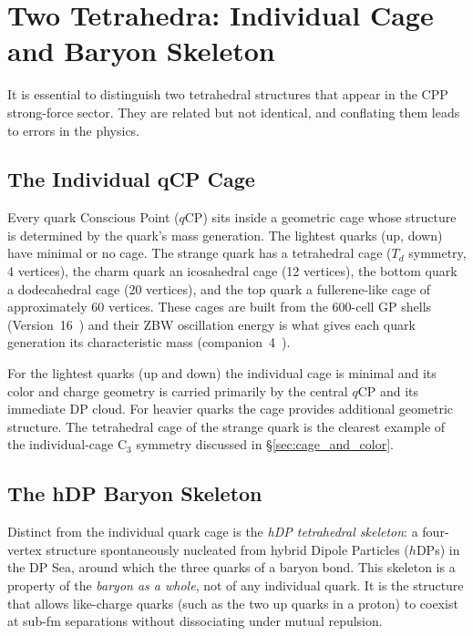\documentclass[12pt]{article}
\newcommand{\qCP}{q\mathrm{CP}}
\newcommand{\hDP}{h\mathrm{DP}}
\newcommand{\Td}{T_d}
\begin{document}
\section{Two Tetrahedra: Individual Cage and Baryon Skeleton}
\label{sec:two_tets}

It is essential to distinguish two tetrahedral structures that appear
in the CPP strong-force sector.  They are related but not identical,
and conflating them leads to errors in the physics.

\subsection{The Individual qCP Cage}

Every quark Conscious Point ($\qCP$) sits inside a geometric cage
whose structure is determined by the quark's mass generation.
The lightest quarks (up, down) have minimal or no cage.  The strange
quark has a tetrahedral cage ($\Td$ symmetry, 4 vertices), the charm
quark an icosahedral cage (12 vertices), the bottom quark a
dodecahedral cage (20 vertices), and the top quark a fullerene-like
cage of approximately 60 vertices.  These cages are built from the
600-cell GP shells (Version~16~\cite{v16}) and their ZBW oscillation
energy is what gives each quark generation its characteristic mass
(companion~4~\cite{c4}).

For the lightest quarks (up and down) the individual cage is minimal
and its color and charge geometry is carried primarily by the central
$\qCP$ and its immediate DP cloud.  For heavier quarks the cage
provides additional geometric structure.  The tetrahedral cage of
the strange quark is the clearest example of the individual-cage
C$_3$ symmetry discussed in §\ref{sec:cage_and_color}.

\subsection{The hDP Baryon Skeleton}

Distinct from the individual quark cage is the \emph{hDP tetrahedral
skeleton}: a four-vertex structure spontaneously nucleated from hybrid
Dipole Particles ($\hDP$s) in the DP Sea, around which the three
quarks of a baryon bond.  This skeleton is a property of the
\emph{baryon as a whole}, not of any individual quark.  It is the
structure that allows like-charge quarks (such as the two up quarks
in a proton) to coexist at sub-fm separations without dissociating
under mutual repulsion.
\end{document}
